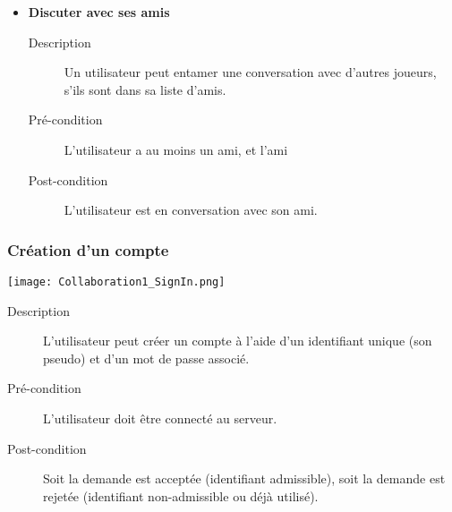 \documentclass{article}
\begin{document}
\begin{itemize}
				\item \textbf{Discuter avec ses amis}
				\begin{description}
					\item[Description] Un utilisateur peut entamer une conversation avec d'autres joueurs, s'ils sont dans sa liste d'amis.
					\item[Pré-condition] L'utilisateur a au moins un ami, et l'ami
					\item[Post-condition] L'utilisateur est en conversation avec son ami.
				\end{description}
			\end{itemize}

		\subsubsection{Création d'un compte}
			\begin{center}\texttt{[image: Collaboration1\_SignIn.png]}\end{center}

			\begin{description}
				\item[Description] L'utilisateur peut créer un compte à l'aide d'un identifiant unique (son pseudo) et d'un mot de passe associé.
				\item[Pré-condition] L'utilisateur doit être connecté au serveur.
				\item[Post-condition] Soit la demande est acceptée (identifiant admissible), soit la demande est rejetée (identifiant non-admissible ou déjà utilisé).
			\end{description}
\end{document}
